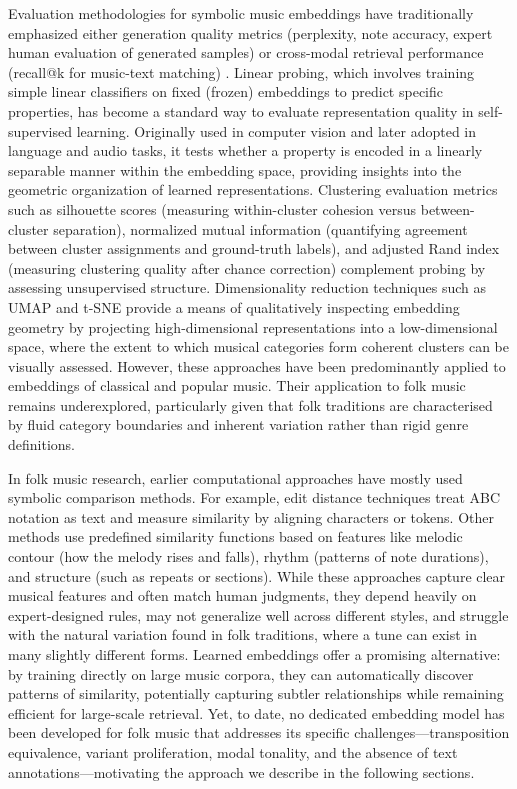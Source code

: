 \documentclass[]{interact}
\theoremstyle{plain}
\theoremstyle{definition}
\theoremstyle{remark}
\begin{document}
Evaluation methodologies for symbolic music embeddings have traditionally emphasized either generation quality metrics (perplexity, note accuracy, expert human evaluation of generated samples) or cross-modal retrieval performance (recall@k for music-text matching) \cite{zhang2023symbolic,ji2023survey}. Linear probing\cite{pagh2007linear}, which involves training simple linear classifiers on fixed (frozen) embeddings to predict specific properties, has become a standard way to evaluate representation quality in self-supervised learning. Originally used in computer vision and later adopted in language and audio tasks, it tests whether a property is encoded in a linearly separable manner within the embedding space, providing insights into the geometric organization of learned representations\cite{levy2023probing}. Clustering evaluation metrics such as silhouette scores\cite{shahapure2020cluster} (measuring within-cluster cohesion versus between-cluster separation), normalized mutual information (quantifying agreement between cluster assignments and ground-truth labels), and adjusted Rand index\cite{santos2009use} (measuring clustering quality after chance correction) complement probing by assessing unsupervised structure. Dimensionality reduction techniques such as UMAP and t-SNE provide a means of qualitatively inspecting embedding geometry by projecting high-dimensional representations into a low-dimensional space, where the extent to which musical categories form coherent clusters can be visually assessed. However, these approaches have been predominantly applied to embeddings of classical and popular music. Their application to folk music remains underexplored, particularly given that folk traditions are characterised by fluid category boundaries and inherent variation rather than rigid genre definitions.

In folk music research, earlier computational approaches have mostly used symbolic comparison methods. For example, edit distance techniques\cite{blumenthal2019new,tremblay2007marking} treat ABC notation as text and measure similarity by aligning characters or tokens. Other methods use predefined similarity functions based on features like melodic contour \cite{schmuckler1999testing,poladian1951melodic} (how the melody rises and falls), rhythm (patterns of note durations), and structure (such as repeats or sections). While these approaches capture clear musical features and often match human judgments, they depend heavily on expert-designed rules, may not generalize well across different styles, and struggle with the natural variation found in folk traditions, where a tune can exist in many slightly different forms. Learned embeddings offer a promising alternative: by training directly on large music corpora, they can automatically discover patterns of similarity, potentially capturing subtler relationships while remaining efficient for large-scale retrieval. Yet, to date, no dedicated embedding model has been developed for folk music that addresses its specific challenges—transposition equivalence, variant proliferation, modal tonality, and the absence of text annotations—motivating the approach we describe in the following sections.
\end{document}
